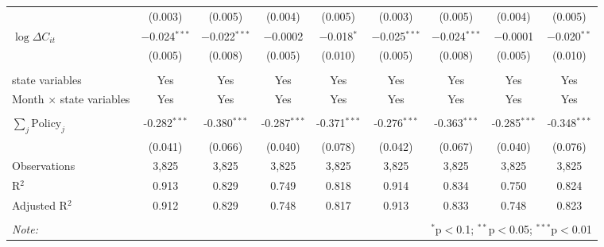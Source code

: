 \begin{tabular}{@{\extracolsep{1pt}}lcccccccc}
  & (0.003) & (0.005) & (0.004) & (0.005) & (0.003) & (0.005) & (0.004) & (0.005) \\ 
  $\log \Delta C_{it}$ & $-$0.024$^{***}$ & $-$0.022$^{***}$ & $-$0.0002 & $-$0.018$^{*}$ & $-$0.025$^{***}$ & $-$0.024$^{***}$ & $-$0.0001 & $-$0.020$^{**}$ \\ 
  & (0.005) & (0.008) & (0.005) & (0.010) & (0.005) & (0.008) & (0.005) & (0.010) \\ 
 \hline \\[-1.8ex] 
state variables & Yes & Yes & Yes & Yes & Yes & Yes & Yes & Yes \\ 
Month $\times$ state variables & Yes & Yes & Yes & Yes & Yes & Yes & Yes & Yes \\ 
\hline \\[-1.8ex] 
$\sum_j \mathrm{Policy}_j$ & -0.282$^{***}$ & -0.380$^{***}$ & -0.287$^{***}$ & -0.371$^{***}$ & -0.276$^{***}$ & -0.363$^{***}$ & -0.285$^{***}$ & -0.348$^{***}$ \\ 
 & (0.041) & (0.066) & (0.040) & (0.078) & (0.042) & (0.067) & (0.040) & (0.076) \\ 
Observations & 3,825 & 3,825 & 3,825 & 3,825 & 3,825 & 3,825 & 3,825 & 3,825 \\ 
R$^{2}$ & 0.913 & 0.829 & 0.749 & 0.818 & 0.914 & 0.834 & 0.750 & 0.824 \\ 
Adjusted R$^{2}$ & 0.912 & 0.829 & 0.748 & 0.817 & 0.913 & 0.833 & 0.748 & 0.823 \\ 
\hline 
\hline \\[-1.8ex] 
\textit{Note:}  & \multicolumn{8}{r}{$^{*}$p$<$0.1; $^{**}$p$<$0.05; $^{***}$p$<$0.01} \\ 
\end{tabular} 